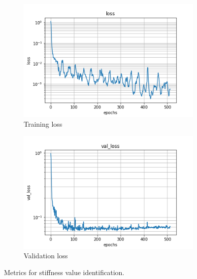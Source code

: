 \documentclass{article}
\begin{document}
\begin{figure}
\centering
\begin{subfigure}[b]{0.45\textwidth}
    \centering
    \includegraphics[totalheight=4cm]{circle_id/stiffval/plotloss.png}
    \caption{Training loss}
  \end{subfigure}
%
\begin{subfigure}[b]{0.45\textwidth}
    \centering
    \includegraphics[totalheight=4cm]{circle_id/stiffval/plotval_loss.png}
    \caption{Validation loss}
  \end{subfigure}
%
\caption{\label{fig:stiffvalmetrics} Metrics for stiffness value identification.}
\end{figure}
%
\end{document}
